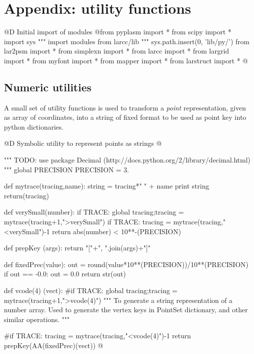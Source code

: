 \documentclass[11pt,oneside]{article}	%
\begin{document}
\appendix
\section{Appendix: utility functions}
@D Initial import of modules
@{from pyplasm import *
from scipy import *
import sys
""" import modules from larcc/lib """
sys.path.insert(0, 'lib/py/')
from lar2psm import *
from simplexn import *
from larcc import *
from largrid import *
from myfont import *
from mapper import *
from larstruct import *
@}
\subsection{Numeric utilities}

A small set of utility functions is used to transform a \emph{point} representation, given as array of coordinates, into a string of fixed format to be used as point key into python dictionaries.

@D Symbolic utility to represent points as strings
@{""" TODO: use package Decimal (http://docs.python.org/2/library/decimal.html) """
global PRECISION
PRECISION = 3.

def mytrace(tracing,name):
	string = tracing*"  " + name
	print string
	return(tracing)

def verySmall(number): 
	if TRACE: global tracing;tracing = mytrace(tracing+1,">verySmall")
	if TRACE: tracing = mytrace(tracing,"<verySmall")-1
	return abs(number) < 10**-(PRECISION)

def prepKey (args): 
	return "["+", ".join(args)+"]"

def fixedPrec(value):
	out = round(value*10**(PRECISION))/10**(PRECISION)
	if out == -0.0: out = 0.0
	return str(out)
	
def vcode(4) (vect): 
	#if TRACE: global tracing;tracing = mytrace(tracing+1,">vcode(4)")
	"""
	To generate a string representation of a number array.
	Used to generate the vertex keys in PointSet dictionary, and other similar operations.
	"""

	#if TRACE: tracing = mytrace(tracing,"<vcode(4)")-1
	return prepKey(AA(fixedPrec)(vect))
@}




\end{document}
